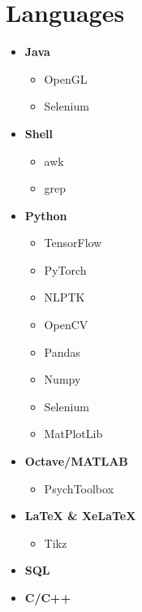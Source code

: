 \documentclass[]{chandan-cv}
\begin{document}
\begin{minipage}[t]{0.27\textwidth}


\section{Languages}
	\begin{itemize}
		\setlength\itemsep{-0.2em}
		\item \textbf{Java}
			\begin{itemize}
				\setlength\itemsep{-0.15em}
				\item OpenGL
				\item Selenium
			\end{itemize}
		\item \textbf{Shell}
			\begin{itemize}
				\setlength\itemsep{-0.15em}
				\item awk
				\item grep
			\end{itemize}
		\item \textbf{Python}
			\begin{itemize}
				\setlength\itemsep{-0.15em}
				\item TensorFlow
				\item PyTorch
				\item NLPTK
				\item OpenCV
				\item Pandas
				\item Numpy
				\item Selenium
				\item MatPlotLib
			\end{itemize}
		\item \textbf{Octave/MATLAB}
			\begin{itemize}
				\setlength\itemsep{-0.15em}
				\item PsychToolbox
			\end{itemize}
		\item \textbf{LaTeX \& XeLaTeX}
			\begin{itemize}
				\setlength\itemsep{-0.15em}
				\item Tikz
			\end{itemize}
		\item \textbf{SQL}
		\item \textbf{C/C++}
	\end{itemize}
\sectionsep


\end{minipage}
\end{document}
